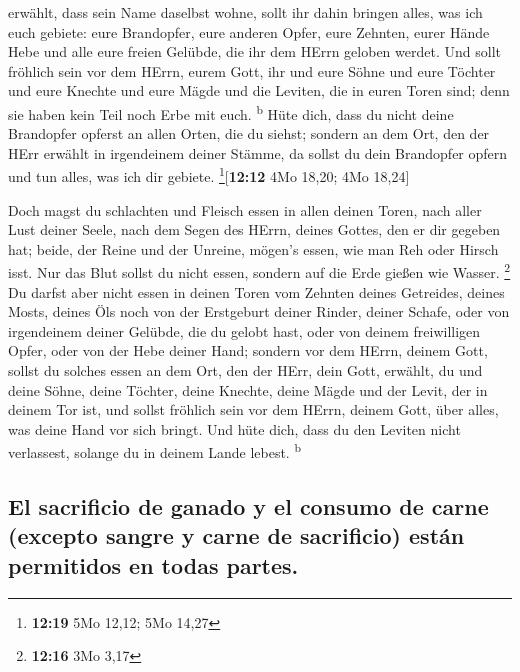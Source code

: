 erwählt, dass sein Name daselbst wohne, sollt ihr dahin bringen alles,
was ich euch gebiete: eure Brandopfer, eure anderen Opfer, eure Zehnten,
eurer Hände Hebe und alle eure freien Gelübde, die ihr dem HErrn geloben
werdet.  Und sollt fröhlich sein vor dem HErrn, eurem
Gott, ihr und eure Söhne und eure Töchter und eure Knechte und eure
Mägde und die Leviten, die in euren Toren sind; denn sie haben kein Teil
noch Erbe mit euch. \textsuperscript{b}  Hüte dich, dass
du nicht deine Brandopfer opferst an allen Orten, die du siehst;
 sondern an dem Ort, den der HErr erwählt in irgendeinem
deiner Stämme, da sollst du dein Brandopfer opfern und tun alles, was
ich dir gebiete. \footnote{\textbf{12:19} 5Mo 12,12; 5Mo 14,27}{[}\textbf{12:12}
4Mo 18,20; 4Mo 18,24{]}

 Doch magst du schlachten und Fleisch essen in allen
deinen Toren, nach aller Lust deiner Seele, nach dem Segen des HErrn,
deines Gottes, den er dir gegeben hat; beide, der Reine und der Unreine,
mögen's essen, wie man Reh oder Hirsch isst.  Nur das
Blut sollst du nicht essen, sondern auf die Erde gießen wie Wasser.
\footnote{\textbf{12:16} 3Mo 3,17}  Du darfst aber nicht
essen in deinen Toren vom Zehnten deines Getreides, deines Mosts, deines
Öls noch von der Erstgeburt deiner Rinder, deiner Schafe, oder von
irgendeinem deiner Gelübde, die du gelobt hast, oder von deinem
freiwilligen Opfer, oder von der Hebe deiner Hand; 
sondern vor dem HErrn, deinem Gott, sollst du solches essen an dem Ort,
den der HErr, dein Gott, erwählt, du und deine Söhne, deine Töchter,
deine Knechte, deine Mägde und der Levit, der in deinem Tor ist, und
sollst fröhlich sein vor dem HErrn, deinem Gott, über alles, was deine
Hand vor sich bringt.  Und hüte dich, dass du den Leviten
nicht verlassest, solange du in deinem Lande lebest. \textsuperscript{b}

\hypertarget{el-sacrificio-de-ganado-y-el-consumo-de-carne-excepto-sangre-y-carne-de-sacrificio-estuxe1n-permitidos-en-todas-partes.}{%
\subsection{El sacrificio de ganado y el consumo de carne (excepto
sangre y carne de sacrificio) están permitidos en todas
partes.}\label{el-sacrificio-de-ganado-y-el-consumo-de-carne-excepto-sangre-y-carne-de-sacrificio-estuxe1n-permitidos-en-todas-partes.}}

